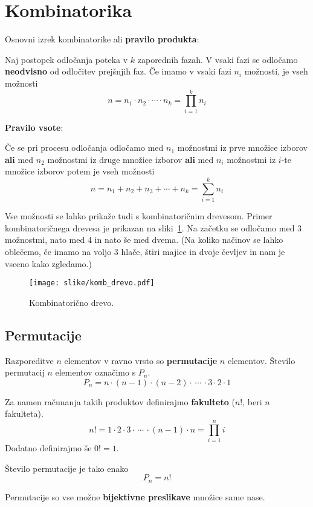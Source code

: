 \documentclass[a4paper,oneside,12pt,fleqn]{article}
\newcommand\krat\cdot
\newcommand{\beforecaptionskip}{\vspace{-12pt}}
\numberwithin{equation}{section}
\begin{document}
\section{Kombinatorika}
\label{sec:komb}

Osnovni izrek kombinatorike ali \textbf{pravilo produkta}:

Naj postopek odločanja poteka v $k$ zaporednih fazah. V vsaki fazi se odločamo
\textbf{neodvisno} od odločitev prejšnjih faz. Če imamo v vsaki fazi $n_i$ možnosti, je
vseh možnosti
\[ n = n_1 \krat n_2 \krat \cdots \krat n_k = \prod_{i=1}^kn_i \]

\textbf{Pravilo vsote}:

Če se pri procesu odločanja odločamo med $n_1$ možnostmi iz prve množice izborov
\textbf{ali} med $n_2$ možnostmi iz druge množice izborov \textbf{ali} med $n_i$ možnostmi
iz $i$-te množice izborov potem je vseh možnosti
\[ n = n_1 + n_2 + n_3 + \cdots + n_k = \sum_{i=1}^kn_i \]

Vse možnosti se lahko prikaže tudi s kombinatoričnim drevesom. Primer kombinatoričnega
drevesa je prikazan na sliki~\ref{fig:komb:drevo}. Na začetku se odločamo med 3 možnostmi,
nato med 4 in nato še med dvema. (Na koliko načinov se lahko oblečemo, če imamo na voljo 3
hlače, štiri majice in dvoje čevljev in nam je vseeno kako zgledamo.)

\begin{figure}[ht]
  \begin{center}
    \texttt{[image: slike/komb\_drevo.pdf]}
   \end{center}
  \beforecaptionskip
  \caption{Kombinatorično drevo.}
  \label{fig:komb:drevo}
\end{figure}

\subsection{Permutacije}
\label{sec:komb:perm}
Razporeditve $n$ elementov v ravno vrsto so \textbf{permutacije} $n$ elementov. Število permutacij
$n$ elementov označimo s $P_n$.
\[ P_n = n\krat(n-1)\krat(n-2)\krat \,\cdots\, \krat 3 \krat 2 \krat 1 \]

Za namen računanja takih produktov definirajmo \textbf{fakulteto} ($n!$, beri $n$
fakulteta).
\[ n! = 1 \krat 2 \krat 3 \krat \,\cdots\, \krat (n-1) \krat n = \prod_{i=1}^ni \]
Dodatno definirajmo še $0! = 1$.

Število permutacije je tako enako
\[ P_n = n! \]

Permutacije so vse možne \textbf{bijektivne preslikave} množice same nase.
\end{document}
